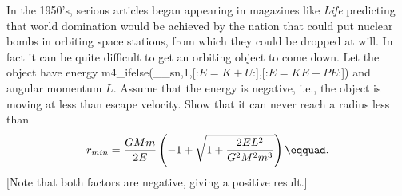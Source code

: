 In the 1950's, serious articles began appearing in
magazines like \emph{Life} predicting that world domination
would be achieved by the nation that could put nuclear bombs
in orbiting space stations, from which they could be dropped
at will. In fact it can be quite difficult to get an
orbiting object to come down. Let the object have energy
m4_ifelse(__sn,1,[:$E=K+U$:],[:$E=KE+PE$:]) and angular momentum $L$. Assume
that the energy is negative, i.e., the object is moving at
less than escape velocity. Show that it can never reach a radius less than
\begin{equation*}
 r_{min}    =     
   \frac{GMm}{2E}\left(-1+\sqrt{1+\frac{2EL^2}{G^2M^2m^3}}\right)
\eqquad.
\end{equation*}
[Note that both factors are negative, giving a positive result.]
